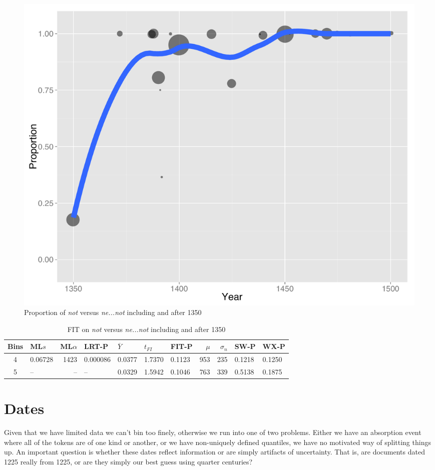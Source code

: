 \begin{figure}
\centering
     \includegraphics[width=\textwidth]{split-plot2.pdf}
\caption{Proportion of \textit{\color{green} not} versus \textit{\color{blue} ne...not} including and after 1350}
\label{split-plot2}
\end{figure}


\begin{table}[ht]
\centering
\begin{tabular}{c  l  r  l  l  l  l   r  r  l  l}
  \hline
Bins & ML$s$ & ML$\alpha$ & LRT-P & $\overline{Y}$ & $t_{FI}$ & FIT-P & $\mu$ & $\sigma_n$ & SW-P & WX-P \\ 
  \hline
  4 & 0.06728 & 1423 & 0.000086 & 0.0377 & 1.7370 & 0.1123 & 953 & 235 & 0.1218 & 0.1250 \\ 
  5 & -- & -- & -- & 0.0329 & 1.5942 & 0.1046 & 763 & 339 & 0.5138 & 0.1875 \\ 
  \hline
\end{tabular}
\caption{FIT on \textit{\color{green} not} versus \textit{\color{blue} ne...not} including and after 1350}
\label{split-table2}
\end{table}


\section{Dates}
\label{Dates}

Given that we have limited data we can't bin too finely, otherwise we run into one of two problems. Either we have an absorption event where all of the tokens are of one kind or another, or we have non-uniquely defined quantiles, we have no motivated way of splitting things up. An important question is whether these dates reflect information or are simply artifacts of uncertainty. That is, are documents dated 1225 really from 1225, or are they simply our best guess using quarter centuries?

